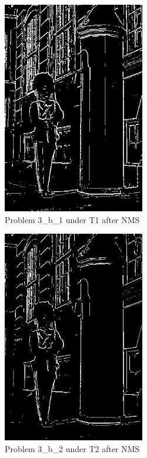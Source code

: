 \documentclass{article}
\begin{document}
\begin{figure}[!h]
  \centering
    \includegraphics[height=25em]{code/outputs/prob3_b_nms1.jpg}
  \caption{Problem 3\_b\_1 under T1 after NMS}
  \label{fig:output3bnms1}
\end{figure}

\begin{figure}[!h]
  \centering
    \includegraphics[height=25em]{code/outputs/prob3_b_nms2.jpg}
  \caption{Problem 3\_b\_2 under T2 after NMS}
  \label{fig:output3bnms2}
\end{figure}
\end{document}
